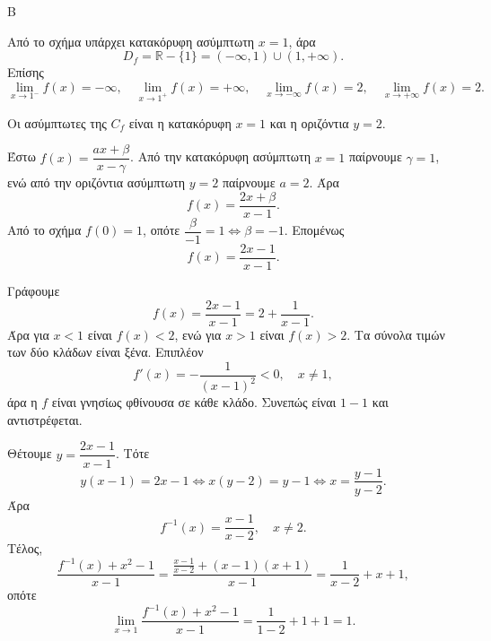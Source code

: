 

\begin{thema}{Β}
\begin{erwthma}
\item Από το σχήμα υπάρχει κατακόρυφη ασύμπτωτη $x=1$, άρα
\[
D_f=\mathbb{R}-\{1\}=(-\infty,1)\cup(1,+\infty).
\]
Επίσης
\[
\lim_{x\to1^-}f(x)=-\infty,\quad
\lim_{x\to1^+}f(x)=+\infty,\quad
\lim_{x\to-\infty}f(x)=2,\quad
\lim_{x\to+\infty}f(x)=2.
\]

\item Οι ασύμπτωτες της $C_f$ είναι η κατακόρυφη $x=1$ και η οριζόντια $y=2$.

\item Έστω $f(x)=\dfrac{ax+\beta}{x-\gamma}$. Από την κατακόρυφη ασύμπτωτη $x=1$ παίρνουμε $\gamma=1$, ενώ από την οριζόντια ασύμπτωτη $y=2$ παίρνουμε $a=2$. Άρα
\[
f(x)=\frac{2x+\beta}{x-1}.
\]
Από το σχήμα $f(0)=1$, οπότε $\dfrac{\beta}{-1}=1\Leftrightarrow \beta=-1$. Επομένως
\[
f(x)=\frac{2x-1}{x-1}.
\]

\item Γράφουμε
\[
f(x)=\frac{2x-1}{x-1}=2+\frac1{x-1}.
\]
Άρα για $x<1$ είναι $f(x)<2$, ενώ για $x>1$ είναι $f(x)>2$. Τα σύνολα τιμών των δύο κλάδων είναι ξένα. Επιπλέον
\[
f'(x)=-\frac1{(x-1)^2}<0,\quad x\ne1,
\]
άρα η $f$ είναι γνησίως φθίνουσα σε κάθε κλάδο. Συνεπώς είναι $1-1$ και αντιστρέφεται.

Θέτουμε $y=\dfrac{2x-1}{x-1}$. Τότε
\[
y(x-1)=2x-1\Leftrightarrow x(y-2)=y-1\Leftrightarrow x=\frac{y-1}{y-2}.
\]
Άρα
\[
f^{-1}(x)=\frac{x-1}{x-2},\quad x\ne2.
\]
Τέλος,
\[
\frac{f^{-1}(x)+x^2-1}{x-1}
=\frac{\frac{x-1}{x-2}+(x-1)(x+1)}{x-1}
=\frac1{x-2}+x+1,
\]
οπότε
\[
\lim_{x\to1}\frac{f^{-1}(x)+x^2-1}{x-1}=\frac1{1-2}+1+1=1.
\]
\end{erwthma}
\end{thema}



